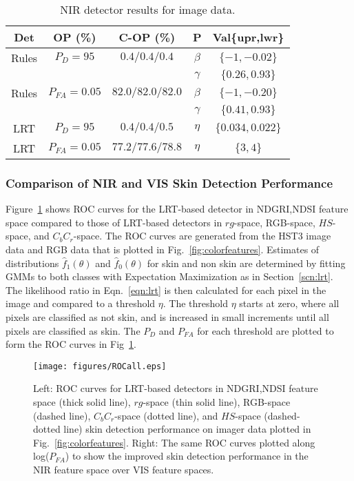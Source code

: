 \documentclass[10pt,journal,cspaper,compsoc]{IEEEtran}
\begin{document}
\begin{table}
\renewcommand{\arraystretch}{1.3}
\caption{NIR detector results for image data.}
\vspace{-0.5cm}
\label{tbl:summary_image}
\begin{center}
\begin{tabular}{|c|c|c|c|c|}
\hline
Det 	 & OP (\%)	      	& C-OP (\%)		& P 		& Val\{upr,lwr\}	\\
\hline
\hline
Rules    & $P_D=95$      	& $0.4/0.4/0.4$		& $\beta$ 	& $\{-1,-0.02\}$ 	\\
	 &			& 			& $\gamma$	& $\{0.26,0.93\}$ 	\\
\hline
Rules    & $P_{FA}=0.05$ 	& $82.0/82.0/82.0$      & $\beta$ 	& $\{-1,-0.20\}$ 	\\
	 & 			& 			& $\gamma$	& $\{0.41,0.93\}$ 	\\
\hline
LRT     & $P_D=95$      	& $0.4/0.4/0.5$		& $\eta$	& $\{0.034,0.022\}$	\\
\hline
LRT     & $P_{FA}=0.05$ 	& $77.2/77.6/78.8$	& $\eta$	& $\{3,4\}$		\\
\hline
\end{tabular}
\end{center}
\end{table}

\subsubsection{Comparison of NIR and VIS Skin Detection Performance}
Figure~\ref{fig:rocall} shows ROC curves for the LRT-based detector in NDGRI,NDSI feature space compared to those of 
LRT-based detectors in $rg$-space, RGB-space, $HS$-space, and $C_bC_r$-space. The ROC curves are generated from the 
HST3 image data and RGB data that is plotted in Fig.~\ref{fig:colorfeatures}. Estimates of distributions 
$\hat f_1(\theta)$ and $\hat f_0(\theta)$ for skin and non skin are determined by fitting GMMs to both classes with 
Expectation Maximization as in Section~\ref{scn:lrt}. The likelihood ratio in Eqn.~\ref{eqn:lrt} is then calculated for each pixel 
in the image and compared to a threshold $\eta$. The threshold $\eta$ starts at zero, where all pixels are classified as 
not skin, and is increased in small increments until all pixels are classified as skin. The $P_D$ and $P_{FA}$ for each 
threshold are plotted to form the ROC curves in Fig~\ref{fig:rocall}.
\begin{figure}[t]
\begin{center}
\texttt{[image: figures/ROCall.eps]}
\caption{Left: ROC curves for LRT-based detectors in NDGRI,NDSI feature space (thick solid line), $rg$-space (thin solid line), 
RGB-space (dashed line), $C_bC_r$-space (dotted line), and $HS$-space (dashed-dotted line) skin detection performance on imager 
data plotted in Fig.~\ref{fig:colorfeatures}. Right: The same ROC curves plotted along log($P_{FA}$) to show the improved skin 
detection performance in the NIR feature space over VIS feature spaces.}
\label{fig:rocall}
\end{center}
\end{figure}
\end{document}
